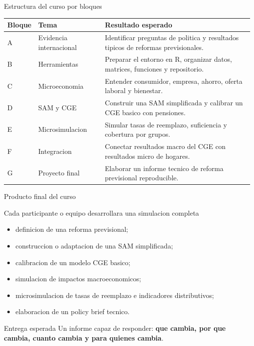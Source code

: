 \documentclass[10pt,aspectratio=169]{beamer}
\begin{document}
\begin{frame}{Estructura del curso por bloques}
\small
\begin{tabular}{p{2.0cm} p{4.1cm} p{6.0cm}}
\toprule
\textbf{Bloque} & \textbf{Tema} & \textbf{Resultado esperado} \\
\midrule
A & Evidencia internacional & Identificar preguntas de politica y resultados tipicos de reformas previsionales. \\
B & Herramientas & Preparar el entorno en R, organizar datos, matrices, funciones y repositorio. \\
C & Microeconomia & Entender consumidor, empresa, ahorro, oferta laboral y bienestar. \\
D & SAM y CGE & Construir una SAM simplificada y calibrar un CGE basico con pensiones. \\
E & Microsimulacion & Simular tasas de reemplazo, suficiencia y cobertura por grupos. \\
F & Integracion & Conectar resultados macro del CGE con resultados micro de hogares. \\
G & Proyecto final & Elaborar un informe tecnico de reforma previsional reproducible. \\
\bottomrule
\end{tabular}
\end{frame}

\begin{frame}{Producto final del curso}
\begin{block}{Cada participante o equipo desarrollara una simulacion completa}
\begin{itemize}
  \item definicion de una reforma previsional;
  \item construccion o adaptacion de una SAM simplificada;
  \item calibracion de un modelo CGE basico;
  \item simulacion de impactos macroeconomicos;
  \item microsimulacion de tasas de reemplazo e indicadores distributivos;
  \item elaboracion de un policy brief tecnico.
\end{itemize}
\end{block}

\vspace{0.2cm}
\begin{alertblock}{Entrega esperada}
Un informe capaz de responder: \textbf{que cambia, por que cambia, cuanto cambia y para quienes cambia}.
\end{alertblock}
\end{frame}
\end{document}
